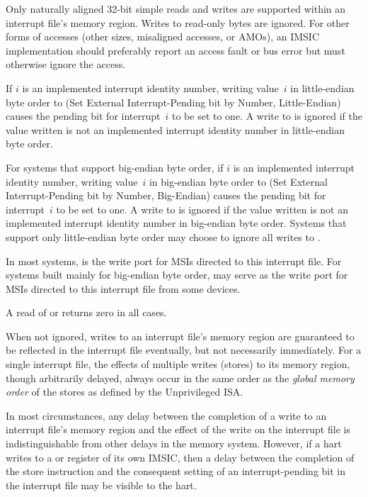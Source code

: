 Only naturally aligned \mbox{32-bit} simple reads and writes are
supported within an interrupt file's memory region.
Writes to read-only bytes are ignored.
For other forms of accesses (other sizes, misaligned accesses, or
AMOs), an IMSIC implementation should preferably report an access fault
or bus error but must otherwise ignore the access.

If $i$ is an implemented interrupt identity number, writing value~$i$
in little-endian byte order to  (Set External
Interrupt-Pending bit by Number, Little-Endian) causes the pending bit
for interrupt~$i$ to be set to one.
A write to  is ignored if the value written is not an
implemented interrupt identity number in little-endian byte order.

For systems that support big-endian byte order, if $i$ is an
implemented interrupt identity number, writing value~$i$ in big-endian
byte order to  (Set External Interrupt-Pending bit by
Number, Big-Endian) causes the pending bit for interrupt~$i$ to be set
to one.
A write to  is ignored if the value written is not an
implemented interrupt identity number in big-endian byte order.
Systems that support only little-endian byte order may choose to ignore
all writes to .

In most systems,  is the write port for MSIs directed
to this interrupt file.
For systems built mainly for big-endian byte order, 
may serve as the write port for MSIs directed to this interrupt file
from some devices.

A read of  or  returns zero in all
cases.

When not ignored, writes to an interrupt file's memory region are
guaranteed to be reflected in the interrupt file eventually, but not
necessarily immediately.
For a single interrupt file, the effects of multiple writes (stores) to
its memory region, though arbitrarily delayed, always occur in the same
order as the \textit{global memory order} of the stores as defined by
the {\RISCV} Unprivileged ISA.

\begin{commentary}
In most circumstances, any delay between the completion of a write to
an interrupt file's memory region and the effect of the write on the
interrupt file is indistinguishable from other delays in the memory
system.
However, if a hart writes to a  or 
register of its own IMSIC, then a delay between the completion of the
store instruction and the consequent setting of an interrupt-pending
bit in the interrupt file may be visible to the hart.
\end{commentary}

